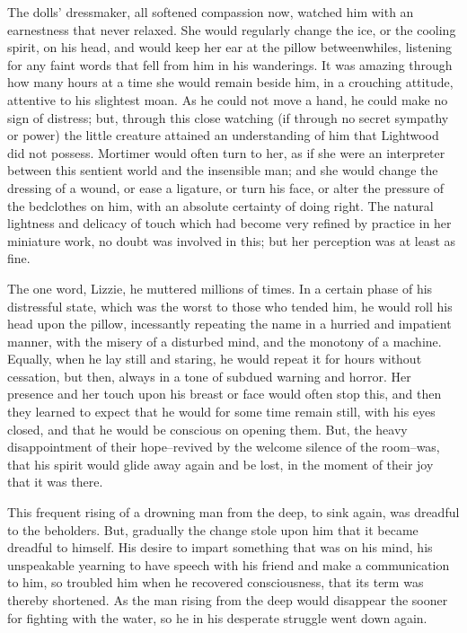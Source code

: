 The dolls’ dressmaker, all softened compassion now, watched him with an
earnestness that never relaxed. She would regularly change the ice, or
the cooling spirit, on his head, and would keep her ear at the pillow
betweenwhiles, listening for any faint words that fell from him in his
wanderings. It was amazing through how many hours at a time she would
remain beside him, in a crouching attitude, attentive to his slightest
moan. As he could not move a hand, he could make no sign of distress;
but, through this close watching (if through no secret sympathy or
power) the little creature attained an understanding of him that
Lightwood did not possess. Mortimer would often turn to her, as if she
were an interpreter between this sentient world and the insensible man;
and she would change the dressing of a wound, or ease a ligature, or
turn his face, or alter the pressure of the bedclothes on him, with an
absolute certainty of doing right. The natural lightness and delicacy of
touch which had become very refined by practice in her miniature work,
no doubt was involved in this; but her perception was at least as fine.

The one word, Lizzie, he muttered millions of times. In a certain phase
of his distressful state, which was the worst to those who tended him,
he would roll his head upon the pillow, incessantly repeating the name
in a hurried and impatient manner, with the misery of a disturbed mind,
and the monotony of a machine. Equally, when he lay still and staring,
he would repeat it for hours without cessation, but then, always in a
tone of subdued warning and horror. Her presence and her touch upon his
breast or face would often stop this, and then they learned to expect
that he would for some time remain still, with his eyes closed, and that
he would be conscious on opening them. But, the heavy disappointment of
their hope--revived by the welcome silence of the room--was, that his
spirit would glide away again and be lost, in the moment of their joy
that it was there.

This frequent rising of a drowning man from the deep, to sink again, was
dreadful to the beholders. But, gradually the change stole upon him that
it became dreadful to himself. His desire to impart something that was
on his mind, his unspeakable yearning to have speech with his friend
and make a communication to him, so troubled him when he recovered
consciousness, that its term was thereby shortened. As the man rising
from the deep would disappear the sooner for fighting with the water, so
he in his desperate struggle went down again.

